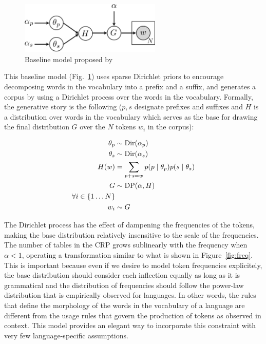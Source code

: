 \begin{figure}[h]
  \centering
  \includegraphics[width=0.6\textwidth]{fig/v1}
  \caption{Baseline model proposed by \cite{goldwater2011}}
  \label{fig:v1}
\end{figure}

This baseline model (Fig.~\ref{fig:v1}) uses sparse Dirichlet priors to encourage decomposing words in the vocabulary into a prefix and a suffix, and generates a corpus by using a Dirichlet process over the words in the vocabulary. Formally, the generative story is the following ($p,s$ designate prefixes and suffixes and $H$ is a distribution over words in the vocabulary which serves as the base for drawing the final distribution $G$ over the $N$ tokens $w_i$ in the corpus):

\begin{align*}
  \theta_p & \sim \mathrm{Dir}(\alpha_p) \\
  \theta_s & \sim \mathrm{Dir}(\alpha_s) \\
  H(w) & = \sum_{p+s=w} p(p \mid \theta_p) p(s \mid \theta_s) \\
  G & \sim \mathrm{DP}(\alpha, H) \\
  \forall i \in \{1 \dots N\} \\
  w_i & \sim G
\end{align*}

The Dirichlet process has the effect of dampening the frequencies of the tokens, making the base distribution relatively insensitive to the scale of the frequencies. The number of tables in the CRP grows sublinearly \cite{goldwater2011} with the frequency when $\alpha < 1$, operating a transformation similar to what is shown in Figure~\ref{fig:freq}. This is important because even if we desire to model token frequencies explicitely, the base distribution should consider each inflection equally as long as it is grammatical and the distribution of frequencies should follow the power-law distribution that is empirically observed for languages. In other words, the rules that define the morphology of the words in the vocabulary of a language are different from the usage rules that govern the production of tokens as observed in context. This model provides an elegant way to incorporate this constraint with very few language-specific assumptions.

